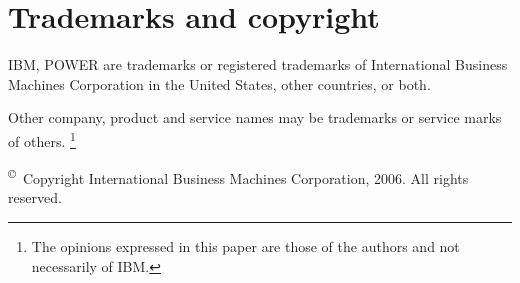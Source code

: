 
\section{Trademarks and copyright}

IBM, POWER are trademarks or registered trademarks of International Business
Machines Corporation in the United States, other countries, or both.

\noindent Other company, product and service names may be trademarks or service
marks of others. \footnote{The opinions expressed in this paper are those of
the authors and not necessarily of IBM.}

\noindent \textsuperscript \copyright\ Copyright International Business
Machines Corporation, 2006. All rights reserved.


